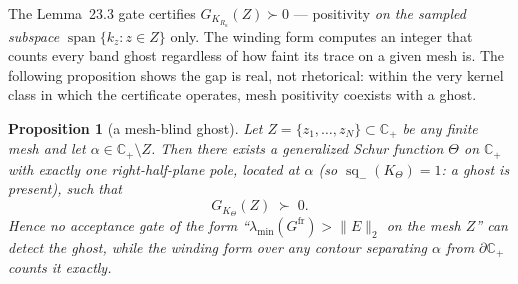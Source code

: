\documentclass[11pt]{article}
\newtheorem{proposition}[theorem]{Proposition}
\theoremstyle{definition}
\theoremstyle{remark}
\newcommand{\CP}{\mathbb{C}_{+}}
\newcommand{\sq}{\operatorname{sq}_{-}}
\begin{document}
The Lemma~23.3 gate certifies $G_{K_{R_a}}(Z)\succ0$ --- positivity \emph{on
the sampled subspace} $\operatorname{span}\{k_z:z\in Z\}$ only. The winding
form computes an integer that counts every band ghost regardless of how faint
its trace on a given mesh is. The following proposition shows the gap is
real, not rhetorical: within the very kernel class in which the certificate
operates, mesh positivity coexists with a ghost.

\begin{proposition}[a mesh-blind ghost]\label{prop:mesh-blind}
Let $Z=\{z_1,\dots,z_N\}\subset\CP$ be any finite mesh and let
$\alpha\in\CP\setminus Z$. Then there exists a generalized Schur function
$\Theta$ on $\CP$ with exactly one right-half-plane pole, located at $\alpha$
(so $\sq(K_\Theta)=1$: a ghost is present), such that
\[
G_{K_\Theta}(Z)\;\succ\;0 .
\]
Hence no acceptance gate of the form
``$\lambda_{\min}(G^{\mathrm{fr}})>\|E\|_2$ on the mesh $Z$'' can detect the
ghost, while the winding form over any contour separating $\alpha$ from
$\partial\CP$ counts it exactly.
\end{proposition}
\end{document}
